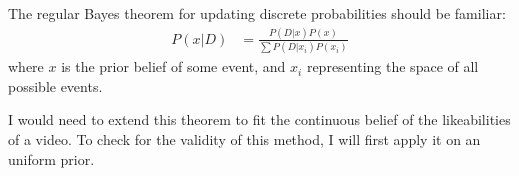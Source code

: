 \documentclass[a4paper,11pt]{article}
\begin{document}

The regular Bayes theorem for updating discrete probabilities should be familiar:
\begin{align*}
    P(x|D) &= \frac{P(D|x) P(x)}{\sum P(D|x_i) P(x_i) }
\end{align*}
where $x$ is the prior belief of some event, and $x_i$ representing the space of all possible events.


I would need to extend this theorem to fit the continuous belief of the likeabilities of a video. To check for the validity of this method, I will first apply it on an uniform prior.
\end{document}
